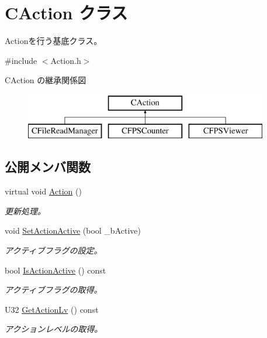\hypertarget{class_c_action}{}\section{C\+Action クラス}
\label{class_c_action}


Actionを行う基底クラス。  




{\ttfamily \#include $<$Action.\+h$>$}

C\+Action の継承関係図\begin{figure}[H]
\begin{center}
\leavevmode
\includegraphics[height=2.000000cm]{class_c_action}
\end{center}
\end{figure}
\subsection*{公開メンバ関数}
\begin{DoxyCompactItemize}
\item 
virtual void \hyperlink{class_c_action_a3fcc5cc0fde844c5cb6e50f7eec9da3c}{Action} ()
\begin{DoxyCompactList}\small\item\em 更新処理。 \end{DoxyCompactList}\item 
void \hyperlink{class_c_action_a247d74af92f6899f99091520ece6489e}{Set\+Action\+Active} (bool \+\_\+b\+Active)
\begin{DoxyCompactList}\small\item\em アクティブフラグの設定。 \end{DoxyCompactList}\item 
bool \hyperlink{class_c_action_ac8373c1407c0078a9e755063c37d0146}{Is\+Action\+Active} () const 
\begin{DoxyCompactList}\small\item\em アクティブフラグの取得。 \end{DoxyCompactList}\item 
U32 \hyperlink{class_c_action_a601d1cdd424423b35f653cfc23120ca1}{Get\+Action\+Lv} () const 
\begin{DoxyCompactList}\small\item\em アクションレベルの取得。 \end{DoxyCompactList}\end{DoxyCompactItemize}
